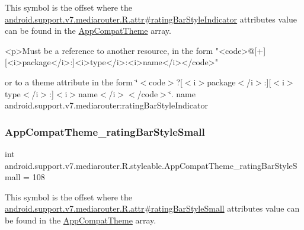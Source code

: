 This symbol is the offset where the \hyperlink{classandroid_1_1support_1_1v7_1_1mediarouter_1_1R_1_1attr_a6da633064108a481fdd0b21392b9ef0e}{android.\+support.\+v7.\+mediarouter.\+R.\+attr\#rating\+Bar\+Style\+Indicator} attribute\textquotesingle{}s value can be found in the \hyperlink{classandroid_1_1support_1_1v7_1_1mediarouter_1_1R_1_1styleable_a4e3d3900c75d49aeb2f283cac00214d6}{App\+Compat\+Theme} array.

\begin{DoxyVerb}      <p>Must be a reference to another resource, in the form "<code>@[+][<i>package</i>:]<i>type</i>:<i>name</i></code>"
\end{DoxyVerb}
 or to a theme attribute in the form \char`\"{}$<$code$>$?\mbox{[}$<$i$>$package$<$/i$>$\+:\mbox{]}\mbox{[}$<$i$>$type$<$/i$>$\+:\mbox{]}$<$i$>$name$<$/i$>$$<$/code$>$\char`\"{}.  name android.\+support.\+v7.\+mediarouter\+:rating\+Bar\+Style\+Indicator \mbox{\label{classandroid_1_1support_1_1v7_1_1mediarouter_1_1R_1_1styleable_a851e1e8d644ea5c0306da068a33f70d1}} 
\subsubsection{\texorpdfstring{App\+Compat\+Theme\+\_\+rating\+Bar\+Style\+Small}{AppCompatTheme\_ratingBarStyleSmall}}
{\footnotesize\ttfamily int android.\+support.\+v7.\+mediarouter.\+R.\+styleable.\+App\+Compat\+Theme\+\_\+rating\+Bar\+Style\+Small = 108\hspace{0.3cm}{\ttfamily [static]}}

This symbol is the offset where the \hyperlink{classandroid_1_1support_1_1v7_1_1mediarouter_1_1R_1_1attr_a715bb6d074e1060db1eaa65d018f0d65}{android.\+support.\+v7.\+mediarouter.\+R.\+attr\#rating\+Bar\+Style\+Small} attribute\textquotesingle{}s value can be found in the \hyperlink{classandroid_1_1support_1_1v7_1_1mediarouter_1_1R_1_1styleable_a4e3d3900c75d49aeb2f283cac00214d6}{App\+Compat\+Theme} array.


